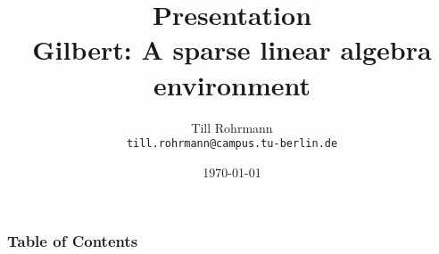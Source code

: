 
\usepackage[utf8]{inputenc}
\usepackage[T1]{fontenc}
\usepackage{lmodern}

\usepackage{listings}
\usepackage{graphicx}
\usepackage{float}
\usepackage{caption}
\captionsetup{labelformat=empty,labelsep=none}

\usepackage{color}
\newcommand{\hilight}[1]{\colorbox{yellow}{#1}}

\usepackage[backend=bibtex, 
firstinits=true,
style=numeric]{biblatex}



  {\list{}
     {%
      \setlength{\leftmargin}{\labelwidth}%
      \setlength{\labelsep}{\biblabelsep}%
      \addtolength{\leftmargin}{\labelsep}%
      \setlength{\itemsep}{\bibitemsep}%
      \setlength{\parsep}{\bibparsep}}}
  {\endlist}
  {\item}


\title{Presentation\\
Gilbert: A sparse linear algebra environment}
\author[T. Rohrmann]{Till Rohrmann\\
\texttt{till.rohrmann@campus.tu-berlin.de}}
\date{\today}
\subject{Gilbert: A sparse linear algebra environment}


		\frame{\titlepage}
		\begin{frame}
			\frametitle{Table of Contents}
			\tableofcontents
		\end{frame}
		
		
		
				
		
		
		
		

